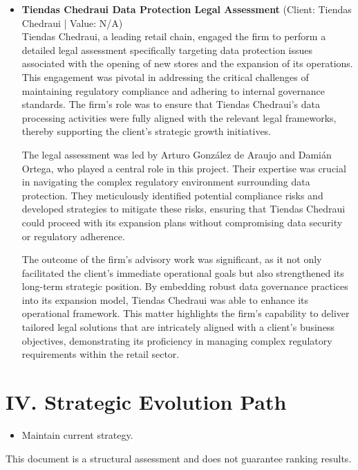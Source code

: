 \documentclass[11pt]{article}
\begin{document}
\begin{itemize}
The successful implementation of this framework not only improved Grupo Modelquipo's compliance posture but also strategically positioned data protection as a fundamental aspect of its operational ethos. This transformation significantly reduced the client's vulnerability to potential data breaches and regulatory penalties, thereby safeguarding its reputation and operational integrity. The outcome of this initiative highlights the firm's ability to deliver bespoke governance solutions that effectively address complex regulatory challenges, reinforcing Grupo Modelquipo's commitment to maintaining a secure and compliant operational environment.
\item \textbf{Tiendas Chedraui Data Protection Legal Assessment} (Client: Tiendas Chedraui | Value: N/A)\\ Tiendas Chedraui, a leading retail chain, engaged the firm to perform a detailed legal assessment specifically targeting data protection issues associated with the opening of new stores and the expansion of its operations. This engagement was pivotal in addressing the critical challenges of maintaining regulatory compliance and adhering to internal governance standards. The firm's role was to ensure that Tiendas Chedraui's data processing activities were fully aligned with the relevant legal frameworks, thereby supporting the client's strategic growth initiatives.

The legal assessment was led by Arturo González de Araujo and Damián Ortega, who played a central role in this project. Their expertise was crucial in navigating the complex regulatory environment surrounding data protection. They meticulously identified potential compliance risks and developed strategies to mitigate these risks, ensuring that Tiendas Chedraui could proceed with its expansion plans without compromising data security or regulatory adherence.

The outcome of the firm's advisory work was significant, as it not only facilitated the client's immediate operational goals but also strengthened its long-term strategic position. By embedding robust data governance practices into its expansion model, Tiendas Chedraui was able to enhance its operational framework. This matter highlights the firm's capability to deliver tailored legal solutions that are intricately aligned with a client's business objectives, demonstrating its proficiency in managing complex regulatory requirements within the retail sector.

\end{itemize}

\section*{IV. Strategic Evolution Path}
\begin{itemize}
\item Maintain current strategy.
\end{itemize}

\vfill
\centering
\small{This document is a structural assessment and does not guarantee ranking results.}
\end{document}
